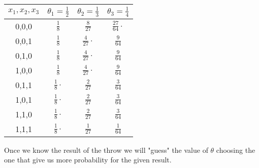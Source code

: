 \begin{enumerate}
\begin{eg}
	\begin{center}
		\begin{tabular}{ | c | c | c | c | }
			\hline
			$x_1,x_2,x_3$ & $\theta_1 = \frac{1}{2}$ & $\theta_2=\frac{1}{3}$ & $\theta_3=\frac{1}{4}$ \\ \hline
			0,0,0 & $\frac{1}{8}$ & $\frac{8}{27}$ & $\frac{27}{64} \cdot$ \\ \hline
			0,0,1 & $\frac{1}{8}$ & $\frac{4}{27} \cdot$ & $\frac{9}{64}$ \\ \hline
			0,1,0 & $\frac{1}{8}$ & $\frac{4}{27} \cdot$ & $\frac{9}{64}$ \\ \hline
			1,0,0 & $\frac{1}{8}$ & $\frac{4}{27} \cdot$ & $\frac{9}{64}$ \\ \hline
			0,1,1 & $\frac{1}{8} \cdot$ & $\frac{2}{27}$ & $\frac{3}{64}$ \\ \hline
			1,0,1 & $\frac{1}{8} \cdot$ & $\frac{2}{27}$ & $\frac{3}{64}$ \\ \hline
			1,1,0 & $\frac{1}{8} \cdot$ & $\frac{2}{27}$ & $\frac{3}{64}$ \\ \hline
			1,1,1 & $\frac{1}{8} \cdot$ & $\frac{1}{27}$ & $\frac{1}{64}$ \\
			\hline
		\end{tabular}
	\end{center}
	Once we know the result of the throw we will "guess" the value of $\theta$ choosing the one that give us more probability for the given result.
	\end{eg}
\end{enumerate}
